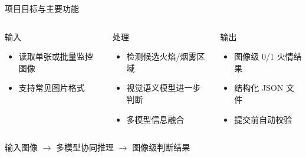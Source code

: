 \documentclass{beamer}
\begin{document}
\begin{frame}{项目目标与主要功能}
  \begin{columns}[t]
      \begin{block}{输入}
        \small
        \begin{itemize}
          \item 读取单张或批量监控图像
          \item 支持常见图片格式
        \end{itemize}
      \end{block}
      \begin{block}{处理}
        \small
        \begin{itemize}
          \item 检测候选火焰/烟雾区域
          \item 视觉语义模型进一步判断
          \item 多模型信息融合
        \end{itemize}
      \end{block}
      \begin{block}{输出}
        \small
        \begin{itemize}
          \item 图像级 0/1 火情结果
          \item 结构化 JSON 文件
          \item 提交前自动校验
        \end{itemize}
      \end{block}
  \end{columns}
  \vspace{0.5em}
  \begin{center}
    \small 输入图像 $\longrightarrow$ 多模型协同推理 $\longrightarrow$ 图像级判断结果
  \end{center}
\end{frame}
\end{document}
